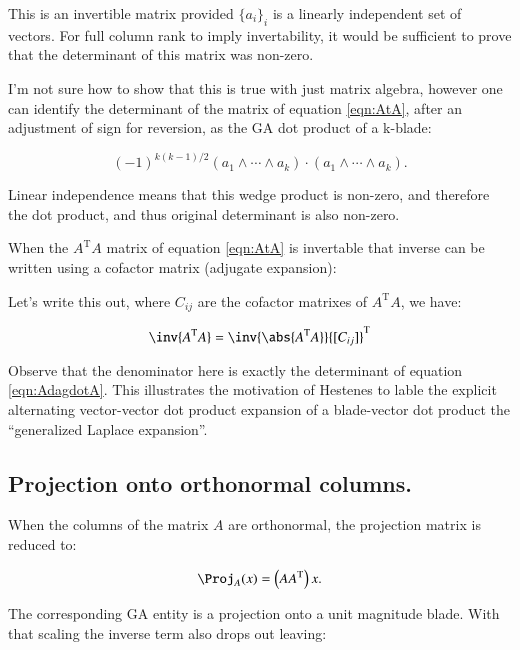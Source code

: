 \documentclass{article}      %
\newcommand{\T}[0]{{\text{T}}}
\newcommand{\Det}[1] {\abs{#1}}
\begin{document}
This is an invertible matrix provided $\{a_i\}_i$ is a linearly independent set of vectors.
For full column rank to imply invertability, it would be sufficient to prove that the 
determinant of this matrix was non-zero.

I'm not sure how to show that this is true with just matrix algebra, however
one can identify the determinant of the matrix of equation \ref{eqn:AtA}, after an adjustment
of sign for reversion, as the GA dot product of a k-blade:

\begin{equation}\label{eqn:AdagdotA}
(-1)^{k(k-1)/2} (a_1 \wedge \cdots \wedge a_k) \cdot (a_1 \wedge \cdots \wedge a_k).
\end{equation}

Linear independence means that this wedge product is non-zero, and therefore the dot product, and thus original determinant is also non-zero.

When the $A^\T A$ matrix of equation \ref{eqn:AtA} is invertable that inverse can be written using a cofactor matrix (adjugate expansion):

Let's write this out, where $C_{ij}$ are the cofactor matrixes of $A^\T A$, we have:

\[
\inv{A^\T A} = \inv{ \Det{ A^\T A } } {[ C_{ij} ]}^\T
\]

Observe that the denominator here is exactly the determinant of equation \ref{eqn:AdagdotA}.  This illustrates
the motivation of Hestenes to lable the explicit alternating vector-vector dot product expansion of a 
blade-vector dot product the ``generalized Laplace expansion''.


\subsection{ Projection onto orthonormal columns. }

When the 
columns of the matrix $A$ are orthonormal, the projection matrix is reduced to:

\[
\Proj_A(x) = \left( A A^\T \right) x.
\]

The corresponding GA entity is a projection onto a unit magnitude blade.  With that scaling the inverse term also drops out leaving:
\end{document}
